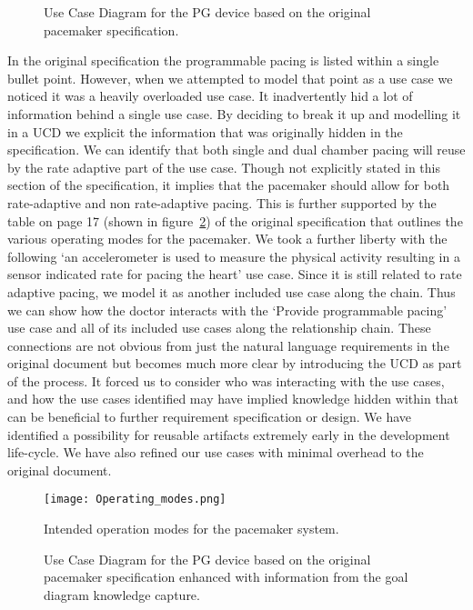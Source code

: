 \begin{figure}
	\centering
	
	\caption{Use Case Diagram for the PG device based on the original pacemaker specification.}
	\label{fig:pg_device_UCD_original_spec}
\end{figure}

In the original specification the programmable pacing is listed within a single bullet point. However, when we attempted to model that point as a use case we noticed it was a heavily overloaded use case. It inadvertently hid a lot of information behind a single use case. By deciding to break it up and modelling it in a UCD we explicit the information that was originally hidden in the specification. We can identify that both single and dual chamber pacing will reuse by the rate adaptive part of the use case. Though not explicitly stated in this section of the specification, it implies that the pacemaker should allow for both rate-adaptive and non rate-adaptive pacing. This is further supported by the table on page 17 (shown in figure~\ref{fig:Operating_modes}) of the original specification that outlines the various operating modes for the pacemaker. We took a further liberty with the following `an accelerometer is used to measure the physical activity resulting in a sensor indicated rate for pacing the heart' use case. Since it is still related to rate adaptive pacing, we model it as another included use case along the chain. Thus we can show how the doctor interacts with the `Provide programmable pacing' use case and all of its included use cases along the relationship chain. These connections are not obvious from just the natural language requirements in the original document but becomes much more clear by introducing the UCD as part of the process. It forced us to consider who was interacting with the use cases, and how the use cases identified may have implied knowledge hidden within that can be beneficial to further requirement specification or design. We have identified a possibility for reusable artifacts extremely early in the development life-cycle. We have also refined our use cases with minimal overhead to the original document.

\begin{figure}
	\centering
	\texttt{[image: Operating\_modes.png]}
	\caption{Intended operation modes for the pacemaker system.}
	\label{fig:Operating_modes}
\end{figure}

\begin{figure}
	\centering
	
	\caption{Use Case Diagram for the PG device based on the original pacemaker specification enhanced with information from the goal diagram knowledge capture.}
	\label{fig:pg_device_UCD}
\end{figure}

